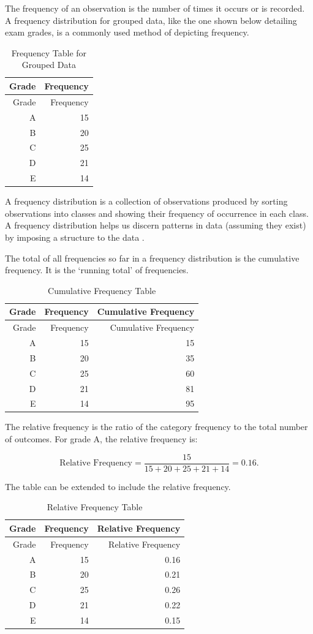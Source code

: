 \documentclass[
]{book}
\begin{document}
The frequency of an observation is the number of times it occurs or is recorded. A frequency distribution for grouped data, like the one shown below detailing exam grades, is a commonly used method of depicting frequency.

\begin{longtable}[]{@{}rr@{}}
\caption{\label{tab:table5}Frequency Table for Grouped Data}\tabularnewline
\toprule
Grade & Frequency \\
\midrule
\endfirsthead
\toprule
Grade & Frequency \\
\midrule
\endhead
A & 15 \\
B & 20 \\
C & 25 \\
D & 21 \\
E & 14 \\
\bottomrule
\end{longtable}

A frequency distribution is a collection of observations produced by sorting observations into classes and showing their frequency of occurrence in each class. A frequency distribution helps us discern patterns in data (assuming they exist) by imposing a structure to the data \citep{Witte2017}.

The total of all frequencies so far in a frequency distribution is the cumulative frequency. It is the `running total' of frequencies.

\begin{longtable}[]{@{}rrr@{}}
\caption{\label{tab:table6}Cumulative Frequency Table}\tabularnewline
\toprule
Grade & Frequency & Cumulative Frequency \\
\midrule
\endfirsthead
\toprule
Grade & Frequency & Cumulative Frequency \\
\midrule
\endhead
A & 15 & 15 \\
B & 20 & 35 \\
C & 25 & 60 \\
D & 21 & 81 \\
E & 14 & 95 \\
\bottomrule
\end{longtable}

The relative frequency is the ratio of the category frequency to the total number of outcomes. For grade A, the relative frequency is:

\[ \textrm{Relative Frequency}=\frac{15}{15+20+25+21+14}=0.16. \]

The table can be extended to include the relative frequency.

\begin{longtable}[]{@{}rrr@{}}
\caption{\label{tab:table7}Relative Frequency Table}\tabularnewline
\toprule
Grade & Frequency & Relative Frequency \\
\midrule
\endfirsthead
\toprule
Grade & Frequency & Relative Frequency \\
\midrule
\endhead
A & 15 & 0.16 \\
B & 20 & 0.21 \\
C & 25 & 0.26 \\
D & 21 & 0.22 \\
E & 14 & 0.15 \\
\bottomrule
\end{longtable}
\end{document}
